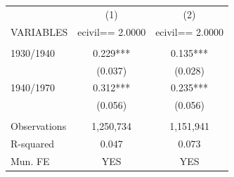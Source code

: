\begin{tabular}{lcc} \hline
 & (1) & (2) \\
VARIABLES & ecivil== 2.0000 & ecivil== 2.0000 \\ \hline
 &  &  \\
1930/1940 & 0.229*** & 0.135*** \\
 & (0.037) & (0.028) \\
1940/1970 & 0.312*** & 0.235*** \\
 & (0.056) & (0.056) \\
 &  &  \\
Observations & 1,250,734 & 1,151,941 \\
R-squared & 0.047 & 0.073 \\
 Mun. FE & YES & YES \\ \hline
\end{tabular}
